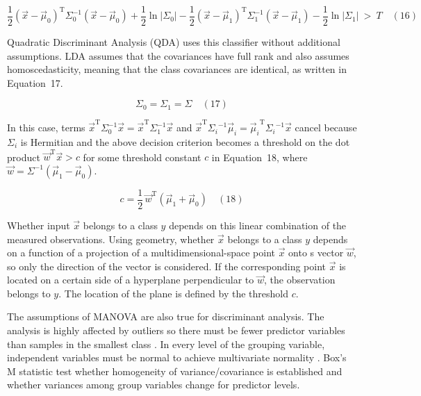 \documentclass[preprint,12pt]{elsarticle}
\begin{document}
\begin{equation}
	{\frac{1}{2}}({\vec{x}}-{\vec{\mu}}_{0})^{\mathrm{T}}\Sigma_{0}^{-1}({\vec{x}}-{\vec{\mu}}_{0})+{\frac{1}{2}}\ln |\Sigma_{0}|-{\frac{1}{2}}({\vec{x}}-{\vec{\mu}}_{1})^{\mathrm{T}}\Sigma_{1}^{-1}({\vec{x}}-{\vec{\mu}}_{1})-{\frac{1}{2}}\ln |\Sigma_{1}|\ >\ T
	\quad\left(16\right)
\end{equation}

Quadratic Discriminant Analysis (QDA) uses this classifier without additional assumptions. LDA assumes that the covariances have full rank and also assumes homoscedasticity, meaning that the class covariances are identical, as written in Equation~17.

\begin{equation}
	\Sigma_{0}=\Sigma_{1}=\Sigma
	\quad\left(17\right)
\end{equation}

In this case, terms ${\vec{x}}^{\mathrm{T}}\Sigma_{0}^{-1}{\vec{x}}={\vec{x}}^{\mathrm{T}}\Sigma_{1}^{-1}{\vec{x}}$ and ${\vec{x}}^{\mathrm{T}}{\Sigma_{i}}^{-1}{\vec{\mu}}_{i}={{\vec{\mu}}_{i}}^{\mathrm{T}}{\Sigma_{i}}^{-1}{\vec{x}}$ cancel because $\Sigma_{i}$ is Hermitian and the above decision criterion becomes a threshold on the dot product ${\vec{w}}^{\mathrm{T}}{\vec{x}}>c$ for some threshold constant $c$ in Equation~18, where ${\vec{w}}=\Sigma ^{-1}({\vec{\mu}}_{1}-{\vec{\mu}}_{0})$.

\begin{equation}
	c={\frac{1}{2}}\,{\vec{w}}^{\mathrm{T}}({\vec{\mu}}_{1}+{\vec{\mu}}_{0})
	\quad\left(18\right)
\end{equation}

Whether input $\vec{x}$ belongs to a class $y$ depends on this linear combination of the measured observations. Using geometry, whether $\vec{x}$ belongs to a class $y$ depends on a function of a projection of a multidimensional-space point $\vec{x}$ onto s vector $\vec{w}$, so only the direction of the vector is considered. If the corresponding point $\vec{x}$ is located on a certain side of a hyperplane perpendicular to $\vec{w}$, the observation belongs to $y$. The location of the plane is defined by the threshold $c$.

The assumptions of MANOVA are also true for discriminant analysis. The analysis is highly affected by outliers so there must be fewer predictor variables than samples in the smallest class \cite{cokluk2008discriminant}. In every level of the grouping variable, independent variables must be normal to achieve multivariate normality \cite{cokluk2008discriminant, hansen2005using}. Box's M statistic \cite{hansen2005using} test whether homogeneity of variance/covariance is established and whether variances among group variables change for predictor levels. 
\end{document}
